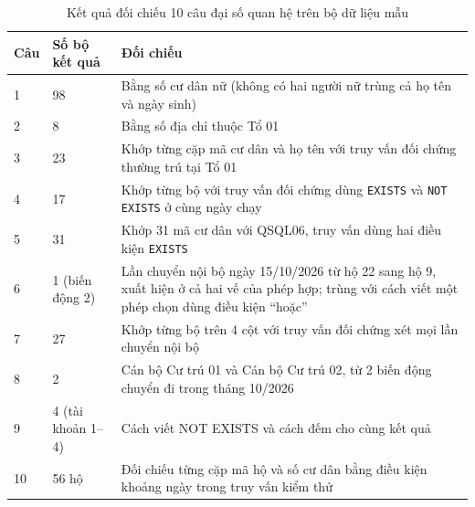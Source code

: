 \begin{table}[H]
\centering
\fontsize{11pt}{14pt}\selectfont
\renewcommand{\arraystretch}{1.28}
\begin{tabularx}{\textwidth}{@{}P{1.05cm}P{2.7cm}Y@{}}
\hline
{}
\textbf{Câu} & \textbf{Số bộ kết quả} & \textbf{Đối chiếu} \\
 & 98 & Bằng số cư dân nữ (không có hai người nữ trùng cả họ tên và ngày sinh) \\
2 & 8 & Bằng số địa chỉ thuộc Tổ 01 \\
3 & 23 & Khớp từng cặp mã cư dân và họ tên với truy vấn đối chứng thường trú tại Tổ 01 \\
4 & 17 & Khớp từng bộ với truy vấn đối chứng dùng \texttt{EXISTS} và \texttt{NOT EXISTS} ở cùng ngày chạy \\
5 & 31 & Khớp 31 mã cư dân với QSQL06, truy vấn dùng hai điều kiện \texttt{EXISTS} \\
6 & 1 (biến động 2) & Lần chuyển nội bộ ngày 15/10/2026 từ hộ 22 sang hộ 9, xuất hiện ở cả hai vế của phép hợp; trùng với cách viết một phép chọn dùng điều kiện ``hoặc'' \\
7 & 27 & Khớp từng bộ trên 4 cột với truy vấn đối chứng xét mọi lần chuyển nội bộ \\
8 & 2 & Cán bộ Cư trú 01 và Cán bộ Cư trú 02, từ 2 biến động chuyển đi trong tháng 10/2026 \\
9 & 4 (tài khoản 1--4) & Cách viết NOT EXISTS và cách đếm cho cùng kết quả \\
10 & 56 hộ & Đối chiếu từng cặp mã hộ và số cư dân bằng điều kiện khoảng ngày trong truy vấn kiểm thử \\
\hline
\end{tabularx}
\caption{Kết quả đối chiếu 10 câu đại số quan hệ trên bộ dữ liệu mẫu}
\label{tab:doichieura}
\end{table}
\endgroup
